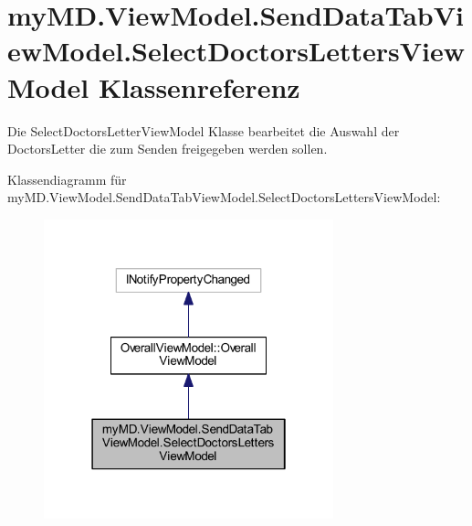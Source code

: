 \hypertarget{classmy_m_d_1_1_view_model_1_1_send_data_tab_view_model_1_1_select_doctors_letters_view_model}{}\section{my\+M\+D.\+View\+Model.\+Send\+Data\+Tab\+View\+Model.\+Select\+Doctors\+Letters\+View\+Model Klassenreferenz}
\label{classmy_m_d_1_1_view_model_1_1_send_data_tab_view_model_1_1_select_doctors_letters_view_model}


Die Select\+Doctors\+Letter\+View\+Model Klasse bearbeitet die Auswahl der Doctors\+Letter die zum Senden freigegeben werden sollen.  




Klassendiagramm für my\+M\+D.\+View\+Model.\+Send\+Data\+Tab\+View\+Model.\+Select\+Doctors\+Letters\+View\+Model\+:
\nopagebreak
\begin{figure}[H]
\begin{center}
\leavevmode
\includegraphics[width=238pt]{classmy_m_d_1_1_view_model_1_1_send_data_tab_view_model_1_1_select_doctors_letters_view_model__inherit__graph}
\end{center}
\end{figure}


